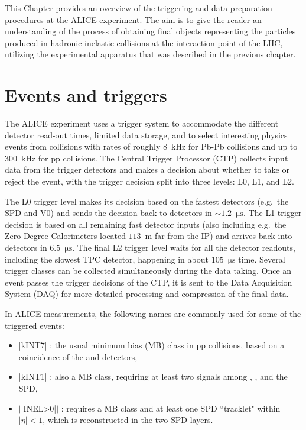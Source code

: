 \def \imgpath {"./figures/tracks"}

This Chapter provides an overview of the triggering and data preparation procedures at the ALICE experiment. The aim is to give the reader an understanding of the process of obtaining final objects representing the particles produced in hadronic inelastic collisions at the interaction point of the LHC, utilizing the experimental apparatus that was described in the previous chapter.

\section{Events and triggers}

The ALICE experiment uses a trigger system \cite{krivdaALICETriggerSystem2012, alicecollaborationPerformanceALICEExperiment2014} to accommodate the different detector read-out times, limited data storage, and to select interesting physics events from collisions with rates of roughly $8$~kHz for Pb-Pb collisions and up to $300$~kHz for pp collisions. The Central Trigger Processor (CTP) collects input data from the trigger detectors and makes a decision about whether to take or reject the event, with the trigger decision split into three levels: L0, L1, and L2. 

The L0 trigger level makes its decision based on the fastest detectors (e.g.\ the SPD and V$0$) and sends the decision back to detectors in $\sim 1.2$~$\mathrm{\mu s}$. The L1 trigger decision is based on all remaining fast detector inputs (also including e.g.\ the Zero Degree Calorimeters located $113$~m far from the IP) and arrives back into detectors in $6.5$~$\mathrm{\mu s}$. The final L2 trigger level waits for all the detector readouts, including the slowest TPC detector, happening in about $105$~$\mathrm{\mu s}$ time. Several trigger classes can be collected simultaneously during the data taking. Once an event passes the trigger decisions of the CTP, it is sent to the Data Acquisition System (DAQ) for more detailed processing and compression of the final data.

In ALICE measurements, the following names are commonly used for some of the triggered events:
\begin{itemize}
\item \spverb|kINT7| :  the usual minimum bias (MB) class in pp collisions, based on a coincidence of the \VOA and \VOC detectors,
\item \spverb|kINT1| : also a MB class, requiring at least two signals among \VOA, \VOC, and the SPD,
\item $|$\spverb|INEL>0|$|$ : requires a MB class and at least one SPD ``tracklet" within $|\eta|<1$, which is reconstructed in the two SPD layers.
\end{itemize} 

